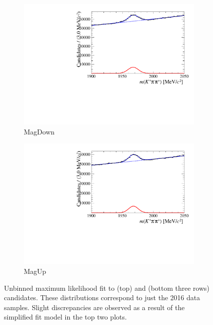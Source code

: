 \begin{figure}[!h]
\begin{subfigure}[t]{0.4\textwidth}
      \includegraphics[width=1.0\textwidth]{figs/Selection/Fit_Data_Bs02DsPi_Ds2KPiPi_2016_MagDown_PreSel.pdf}
      \caption{\decay{\Dsp}{\Kp\pim\pip} MagDown}
   \end{subfigure}
   \begin{subfigure}[t]{0.4\textwidth}
      \centering
      \includegraphics[width=1.0\textwidth]{figs/Selection/Fit_Data_Bs02DsPi_Ds2KPiPi_2016_MagUp_PreSel.pdf}
      \caption{\decay{\Dsp}{\Kp\pim\pip} MagUp}
   \end{subfigure}
   \caption{Unbinned maximum likelihood fit to \decay{\Bs}{\jpsi\phiz} (top) and \decay{\Bsb}{\Dsp\pim} (bottom three rows) candidates. These distributions correspond to just the 2016 data samples. Slight discrepancies are observed as a result of the simplified fit model in the top two plots.}
   \label{fig:mvatrainingsamples}
\end{figure}


